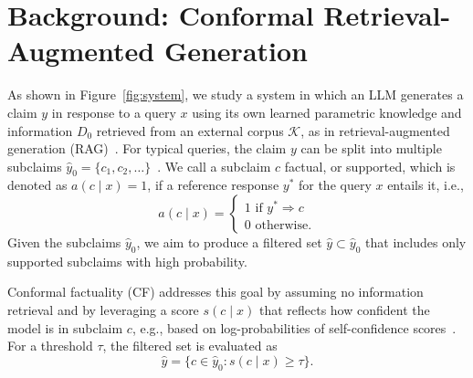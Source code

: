 \section{Background: Conformal Retrieval-Augmented Generation}\label{sec:background}
 
As shown in Figure~\ref{fig:system}, we study a system in which an LLM generates a claim $y$ in response to a query $x$ using its own learned parametric knowledge and information $D_0$ retrieved from an external corpus $\mathcal{K}$, as in retrieval-augmented generation (RAG)~\cite{lewis2020retrieval}. For typical queries, the claim $y$ can be split into multiple subclaims $\hat{y}_0 = \{c_1, c_2, \ldots\}$~\cite{min2023factscore,wei2024longform}. We call a subclaim $c$ factual, or supported, which is denoted as $a(c \mid x) = 1$, if a reference response $y^*$ for the query $x$ entails it, i.e.,  
\begin{equation}
  a(c \mid x) = \begin{cases}
  1 \text{ if } y^* \Rightarrow c \\
  0 \text{ otherwise.}
  \end{cases}
\end{equation}
Given the subclaims $\hat{y}_0$, we aim to produce a filtered set $\hat{y} \subset \hat{y}_0$ that includes only supported subclaims with high probability.
 
Conformal factuality (CF) \cite{mohri2024language} addresses this goal by assuming no information retrieval and by leveraging a score $s(c \mid x)$ that reflects how confident the model is in subclaim $c$, e.g., based on log-probabilities of self-confidence scores~\cite{kadavath2022language,tian2023just}. For a threshold $\tau$, the filtered set is evaluated as
\begin{equation}\label{eq:filter_set}
  \hat{y} = \{ c \in \hat{y}_0 : s(c \mid x) \geq \tau \}.
\end{equation}

